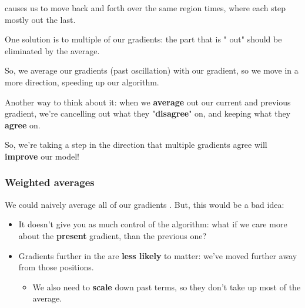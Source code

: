             \begin{concept}
                 causes us to move back and forth over the same region  times, where each step mostly  out the last.
                
                One solution is to  multiple of our gradients: the part that is " out" should be eliminated by the average.
                
                So, we average our  gradients (past oscillation) with our  gradient, so we move in a more  direction, speeding up our algorithm.
            \end{concept}
            
            Another way to think about it: when we \textbf{average} out our current and previous gradient, we're cancelling out what they "\textbf{disagree}" on, and keeping what they \textbf{agree} on.
            
            So, we're taking a step in the direction that multiple gradients agree will \textbf{improve} our model!
            
        
        \phantom{}
            
        \subsubsection{Weighted averages}
        
            We could naively average all of our gradients . But, this would be a bad idea:
            
            \begin{itemize}
                \item It doesn't give you as much control of the algorithm: what if we care more about the \textbf{present} gradient, than the previous one?
                \item Gradients further in the  are \textbf{less likely} to matter: we've moved further away from those positions.
                    \begin{itemize}
                        \item We also need to \textbf{scale} down past terms, so they don't take up most of the average.
                    \end{itemize}
            \end{itemize}
            
